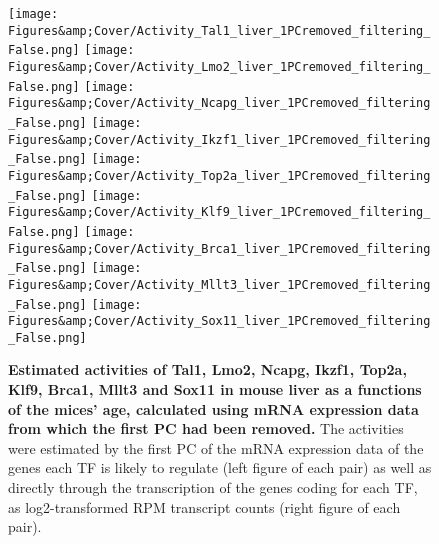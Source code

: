 \begin{figure}
    \centering
    \texttt{[image: Figures\&amp;Cover/Activity\_Tal1\_liver\_1PCremoved\_filtering\_False.png]}
    \hspace{0.25cm}
    \vspace{0.25cm}
    \texttt{[image: Figures\&amp;Cover/Activity\_Lmo2\_liver\_1PCremoved\_filtering\_False.png]}
    \vspace{0.25cm}
    \texttt{[image: Figures\&amp;Cover/Activity\_Ncapg\_liver\_1PCremoved\_filtering\_False.png]}
    \hspace{0.25cm}
    \texttt{[image: Figures\&amp;Cover/Activity\_Ikzf1\_liver\_1PCremoved\_filtering\_False.png]}
    \vspace{0.25cm}
    \texttt{[image: Figures\&amp;Cover/Activity\_Top2a\_liver\_1PCremoved\_filtering\_False.png]}
    \hspace{0.25cm}
    \texttt{[image: Figures\&amp;Cover/Activity\_Klf9\_liver\_1PCremoved\_filtering\_False.png]}
    \vspace{0.25cm}
    \texttt{[image: Figures\&amp;Cover/Activity\_Brca1\_liver\_1PCremoved\_filtering\_False.png]}
    \hspace{0.25cm}
    \texttt{[image: Figures\&amp;Cover/Activity\_Mllt3\_liver\_1PCremoved\_filtering\_False.png]}
    \vspace{0.25cm}
    \texttt{[image: Figures\&amp;Cover/Activity\_Sox11\_liver\_1PCremoved\_filtering\_False.png]}
    \caption{\textbf{Estimated activities of Tal1, Lmo2, Ncapg, Ikzf1, Top2a, Klf9, Brca1, Mllt3 and Sox11 in mouse liver as a functions of the mices' age, calculated using mRNA expression data from which the first \ac{PC} had been removed.} The activities were estimated by the first \ac{PC} of the mRNA expression data of the genes each \ac{TF} is likely to regulate (left figure of each pair) as well as directly through the transcription of the genes coding for each \ac{TF}, as log2-transformed \ac{RPM} transcript counts (right figure of each pair).}
    \label{fig:LiverEstsClean1}
\end{figure}


